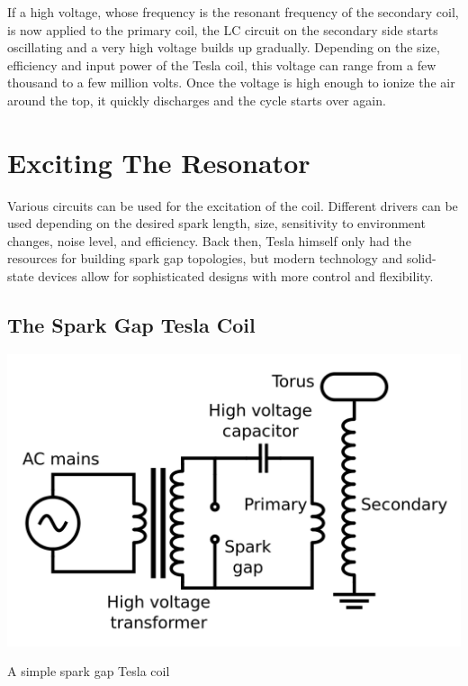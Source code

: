 If a high voltage, whose frequency is the resonant frequency of the secondary coil, is now applied to the primary coil, the LC circuit on the secondary side starts oscillating and a very high voltage builds up gradually. Depending on the size, efficiency and input power of the Tesla coil, this voltage can range from a few thousand to a few million volts. Once the voltage is high enough to ionize the air around the top, it quickly discharges and the cycle starts over again.

\section{Exciting The Resonator}

Various circuits can be used for the excitation of the coil. Different drivers can be used depending on the desired spark length, size, sensitivity to environment changes, noise level, and efficiency. Back then, Tesla himself only had the resources for building spark gap topologies, but modern technology and solid-state devices allow for sophisticated designs with more control and flexibility.

\subsection{The Spark Gap Tesla Coil}

\begin{marginfigure}
\includegraphics[width=\textwidth]{simon/resources/sparkGapTeslaCoil.png}
\caption{A simple spark gap Tesla coil}
\end{marginfigure}

